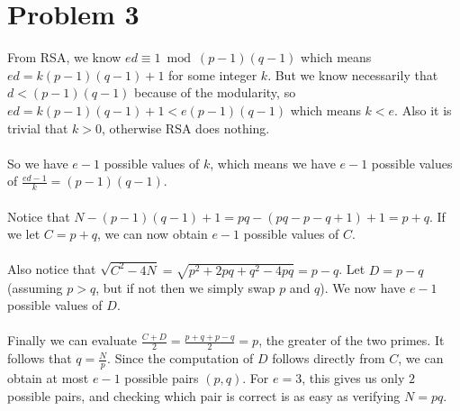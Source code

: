 \documentclass[11pt]{article}
\newcounter{problemnumber}
\begin{document}
\section*{Problem 3}
From RSA, we know $ed \equiv 1 \bmod (p-1)(q-1)$ which means $ed = k(p-1)(q-1)+1$ for some integer $k$. But we know necessarily that $d<(p-1)(q-1)$ because of the modularity, so $ed=k(p-1)(q-1)+1<e(p-1)(q-1)$ which means $k<e$. Also it is trivial that $k>0$, otherwise RSA does nothing. \\\\
So we have $e-1$ possible values of $k$, which means we have $e-1$ possible values of $\frac{ed-1}k = (p-1)(q-1)$. \\\\
Notice that $N-(p-1)(q-1)+1 = pq-(pq-p-q+1)+1 = p+q$. If we let $C=p+q$, we can now obtain $e-1$ possible values of $C$. \\\\
Also notice that $\sqrt{C^2-4N} = \sqrt{p^2+2pq+q^2-4pq} = p-q$. Let $D=p-q$ (assuming $p>q$, but if not then we simply swap $p$ and $q$). We now have $e-1$ possible values of $D$. \\\\
Finally we can evaluate $\frac{C+D}2 = \frac{p+q+p-q}2 = p$, the greater of the two primes. It follows that $q=\frac Np$. Since the computation of $D$ follows directly from $C$, we can obtain at most $e-1$ possible pairs $(p,q)$. For $e=3$, this gives us only $2$ possible pairs, and checking which pair is correct is as easy as verifying $N=pq$.


\newpage
\end{document}
